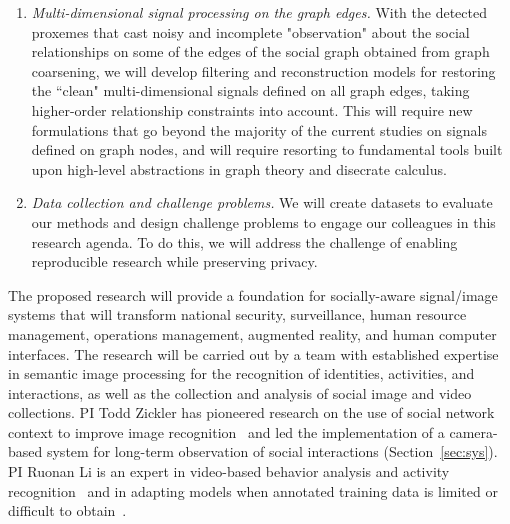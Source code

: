 \begin{enumerate}
\vspace{-0.1in}\item \emph{Multi-dimensional signal processing on the graph edges.} With the detected proxemes that cast noisy and incomplete "observation" about the social relationships on some of the edges of the social graph obtained from graph coarsening, we will develop filtering and reconstruction models for restoring the ``clean" multi-dimensional signals defined on all graph edges, taking higher-order relationship constraints into account. This will require new formulations that go beyond the majority of the current studies on signals defined on graph nodes, and will require resorting to fundamental tools built upon high-level abstractions in graph theory and disecrate calculus.


\vspace{-0.1in}\item \emph{Data collection and challenge problems.} We will create datasets to evaluate our methods and design challenge problems to engage our colleagues in this research agenda. To do this, we will address the challenge of enabling reproducible research while preserving privacy.

\end{enumerate}

The proposed research will provide a foundation for socially-aware signal/image systems that will transform national security, surveillance, human resource management, operations management, augmented reality, and human computer interfaces. The research will be carried out by a team with established expertise in semantic image processing for the recognition of identities, activities, and interactions, as well as the collection and analysis of social image and video collections. PI Todd Zickler has pioneered research on the use of social network context to improve image recognition~\cite{Stone2008,Stone2010} and led the implementation of a camera-based system for long-term observation of social interactions (Section~\ref{sec:sys}). PI Ruonan Li is an expert in video-based behavior analysis and activity recognition~\cite{groupdet2013,LiIJCV2012,LiPAMI2012,Li2010} and in adapting models when annotated training data is limited or difficult to obtain~\cite{LiZickler2012,Li2011}. 



